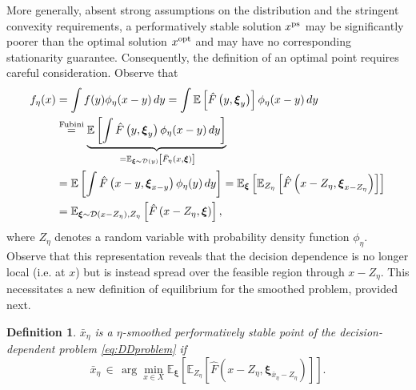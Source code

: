 \documentclass[11pt,reqno]{amsart}
\newcommand{\1}{{\bf 1}}
\newcommand{\2}{{\bf 2}}
\newcommand{\bxi}{\boldsymbol{\xi}}
\newcommand{\E}{\mathbb E}
\numberwithin{equation}{section}
\newtheorem{definition}{Definition}[section]
\theoremstyle{remark}
\begin{document}
{				\medskip
				
				More generally, absent strong assumptions on the distribution and the stringent convexity requirements, a performatively stable solution $x^{\rm ps}$ may be significantly poorer than the optimal solution $x^{\rm opt}$ and may 
				have no corresponding stationarity guarantee. Consequently, the definition of an optimal point requires careful consideration.
				Observe that
				\begin{align}
					f_\eta(x) & =\int f(y) \phi_\eta(x-y) \, d y  =\int \mathbb{E}\left[\hat{F}\left(y, \bxi_y\right)\right] \phi_\eta(x-y) \, d y \nonumber\\
					& \stackrel{\text{Fubini}}{=}\underbrace{\mathbb{E}\left[\int \hat{F}\left(y, \bxi_y\right) \phi_\eta(x-y) \, d y\right]}_{\, =\mathbb{E}_{\bxi {\sim {\mathcal{D}}(y)}} \left[\bar{F}_\eta(x, \bxi)\right]} \label{eq:DDeqf1}\\
					& =\mathbb{E}\left[\int \hat{F}\left(x-y, \bxi_{x-y}\right) \phi_\eta(y) \, d y\right] \nonumber
					=\mathbb{E}_{\bxi}\left[\mathbb{E}_{Z_\eta}\left[\hat{F}\left(x-Z_\eta, \bxi_{x-Z_\eta}\right)\right]\right]\notag \\
					& =\mathbb{E}_{{\bxi \sim {\mathcal{D}}(x-Z_{\eta}), Z_{\eta}}}\left[\hat{F}\left(x-Z_\eta, \bxi\right)\right], \label{eq:DDeqf2}
				\end{align}
				where $Z_\eta$ denotes a random variable with probability density function $\phi_\eta$. Observe that this representation reveals that the decision dependence is no longer local (i.e. at $x$) but is instead  spread over the feasible region through $x-Z_{\eta}$.
				This necessitates a new definition of equilibrium for the smoothed problem, provided next.  \\
				
				\begin{definition}\label{def:etasmeq}
					$\bar{x}_\eta$ is a $\eta$-smoothed {performatively stable point} of the decision-dependent problem \eqref{eq:DDproblem} if
					\begin{equation*}
						\bar{x}_\eta  \, {\in} \, \arg\min_{x\in X}\E_{\bxi}\left[\E_{Z_{\eta}}\left[\hat{F}\left(x-Z_\eta,\bxi_{\bar{x}_\eta-Z_\eta}\right)\right]\right]. 
					\end{equation*} 
					

\end{definition}}
\end{document}

